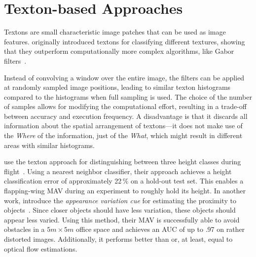 \section{Texton-based Approaches}
\label{sec:textonbasedapproaches}

Textons are small characteristic image patches that can be used as image features.
\citeauthor{varma2005statistical} originally introduced textons for
classifying different textures, showing that they outperform
computationally more complex algorithms, like Gabor
filters~\cite{varma2005statistical}.

Instead of convolving a window over the entire image, the filters can be applied at randomly sampled image positions, leading to similar texton histograms compared to the histograms when full sampling is used. The choice of the number of samples allows for modifying the computational effort, resulting in a
trade-off between accuracy and execution frequency. A disadvantage is
that it discards all information about the spatial arrangement of
textons---it does not make use of the \emph{Where} of the information,
just of the \emph{What}, which might result in different areas with
similar histograms.

\citeauthor{de2009design} use the texton approach for distinguishing
between three height classes during flight~\cite{de2009design}. Using
a nearest neighbor classifier, their approach achieves a height
classification error of approximately 22\,\% on a hold-out test set.
This enables a flapping-wing MAV during an experiment to roughly hold
its height. In another work, \citeauthor{de2012appearance} introduce
the \emph{appearance variation cue} for estimating the proximity to
objects~\cite{de2012appearance}. Since closer objects should have less
variation, these objects should appear less varied. Using this method,
their MAV is successfully able to avoid obstacles in a $5m \times 5m$
office space and achieves an AUC of up to .97 on rather distorted
images. Additionally, it performs better than or, at least, equal to
optical flow estimations.